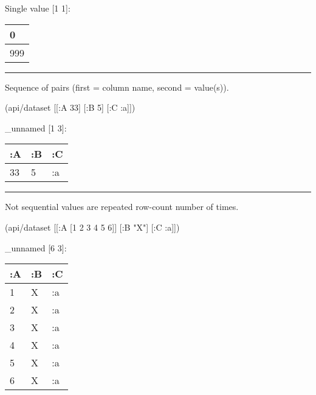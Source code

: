 \documentclass[]{article}
\newenvironment{Shaded}{\begin{snugshade}}{\end{snugshade}}
\newcommand{\AttributeTok}[1]{\textcolor[rgb]{0.77,0.63,0.00}{#1}}
\newcommand{\DecValTok}[1]{\textcolor[rgb]{0.00,0.00,0.81}{#1}}
\newcommand{\NormalTok}[1]{#1}
\newcommand{\StringTok}[1]{\textcolor[rgb]{0.31,0.60,0.02}{#1}}
\begin{document}
Single value {[}1 1{]}:

\begin{longtable}[]{@{}l@{}}
\toprule
0\tabularnewline
\midrule
\endhead
999\tabularnewline
\bottomrule
\end{longtable}

\begin{center}\rule{0.5\linewidth}{0.5pt}\end{center}

Sequence of pairs (first = column name, second = value(s)).

\begin{Shaded}
\begin{Highlighting}[]
\NormalTok{(api/dataset [[}\AttributeTok{:A} \DecValTok{33}\NormalTok{] [}\AttributeTok{:B} \DecValTok{5}\NormalTok{] [}\AttributeTok{:C} \AttributeTok{:a}\NormalTok{]])}
\end{Highlighting}
\end{Shaded}

\_unnamed {[}1 3{]}:

\begin{longtable}[]{@{}lll@{}}
\toprule
:A & :B & :C\tabularnewline
\midrule
\endhead
33 & 5 & :a\tabularnewline
\bottomrule
\end{longtable}

\begin{center}\rule{0.5\linewidth}{0.5pt}\end{center}

Not sequential values are repeated row-count number of times.

\begin{Shaded}
\begin{Highlighting}[]
\NormalTok{(api/dataset [[}\AttributeTok{:A}\NormalTok{ [}\DecValTok{1} \DecValTok{2} \DecValTok{3} \DecValTok{4} \DecValTok{5} \DecValTok{6}\NormalTok{]] [}\AttributeTok{:B} \StringTok{"X"}\NormalTok{] [}\AttributeTok{:C} \AttributeTok{:a}\NormalTok{]])}
\end{Highlighting}
\end{Shaded}

\_unnamed {[}6 3{]}:

\begin{longtable}[]{@{}lll@{}}
\toprule
:A & :B & :C\tabularnewline
\midrule
\endhead
1 & X & :a\tabularnewline
2 & X & :a\tabularnewline
3 & X & :a\tabularnewline
4 & X & :a\tabularnewline
5 & X & :a\tabularnewline
6 & X & :a\tabularnewline
\bottomrule
\end{longtable}
\end{document}
